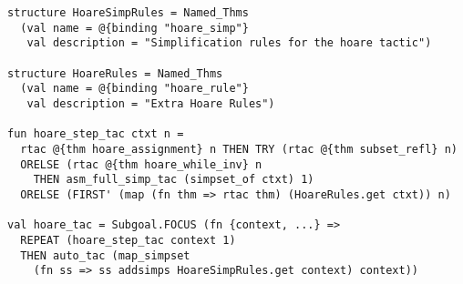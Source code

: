 \documentclass{llncs}
\begin{document}
{
\small
\begin{verbatim}
structure HoareSimpRules = Named_Thms
  (val name = @{binding "hoare_simp"}
   val description = "Simplification rules for the hoare tactic")

structure HoareRules = Named_Thms
  (val name = @{binding "hoare_rule"}
   val description = "Extra Hoare Rules")

fun hoare_step_tac ctxt n =
  rtac @{thm hoare_assignment} n THEN TRY (rtac @{thm subset_refl} n)
  ORELSE (rtac @{thm hoare_while_inv} n
    THEN asm_full_simp_tac (simpset_of ctxt) 1)
  ORELSE (FIRST' (map (fn thm => rtac thm) (HoareRules.get ctxt)) n)

val hoare_tac = Subgoal.FOCUS (fn {context, ...} =>
  REPEAT (hoare_step_tac context 1)
  THEN auto_tac (map_simpset
    (fn ss => ss addsimps HoareSimpRules.get context) context))
\end{verbatim}
}

\end{document}
